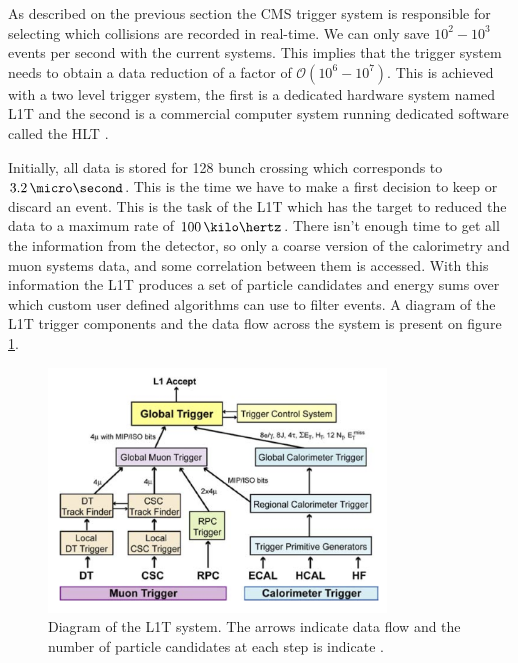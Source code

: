 
As described on the previous section the \gls{CMS} trigger system is responsible for selecting which collisions are recorded in real-time. We can only save $10^2-10^3$ events per second with the current systems. This implies that the trigger system needs to obtain a data reduction of a factor of $\mathcal{O}(10^6-10^7)$. This is achieved with a two level trigger system, the first is a dedicated hardware system named \acrfull{L1T} \cite{CMSTDR:CMSTridasTDRVol1} and the second is a commercial computer system running dedicated software called the \acrfull{HLT} \cite{CMSTDR:CMSTridasTDRVol2}.

Initially, all data is stored for 128 bunch crossing which corresponds to $3.2\,\micro\second$. This is the time we have to make a first decision to keep or discard an event. This is the task of the \gls{L1T} which has the target to reduced the data to a maximum rate of $100\,\kilo\hertz$. There isn't enough time to get all the information from the detector, so only a coarse version of the calorimetry and muon systems data, and some correlation between them is accessed. With this information the \gls{L1T} produces a set of particle candidates and energy sums over which custom user defined algorithms can use to filter events. A diagram of the \gls{L1T} trigger components and the data flow across the system is present on figure \ref{FIGURE:ExperimentalApparatus_CMS_L1T_Layout}.

\begin{figure}[!htb]
  \centering
  \includegraphics[width=0.80\textwidth]{Chapter02/CMS/Images/CMS_L1T_Layout.png}
  \caption{Diagram of the \gls{L1T} system. The arrows indicate data flow and the number of particle candidates at each step is indicate \cite{ARTICLE:TheCMSExperiment}.}
  \label{FIGURE:ExperimentalApparatus_CMS_L1T_Layout}
\end{figure}

